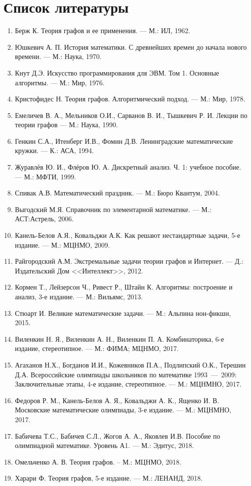 \sloppy
\chapter*{Список литературы}
\begin{enumerate}
\item Берж К. Теория графов и ее применения. --- М.: ИЛ, 1962.
\item Юшкевич А. П. История математики. С древнейших времен до начала нового времени. --- М.: Наука, 1970.
\item Кнут Д.Э. Искусство программирования для ЭВМ. Том 1. Основные алгоритмы. --- М.: Мир, 1976.
\item Кристофидес Н. Теория графов. Алгоритмический подход. --- М.: Мир, 1978.
\item Емеличев В. А., Мельников О.И., Сарванов В. И., Тышкевич Р. И. Лекции по теории графов --- М.: Наука, 1990.
\item Генкин С.А., Итенберг И.В., Фомин Д.В. Ленинградские математические кружки. --- К.: АСА, 1994.
\item Журавлёв Ю. И., Флёров Ю. А. Дискретный анализ. Ч. 1: учебное пособие. --- М.: МФТИ, 1999.
\item Спивак А.В. Математический праздник. --- М.: Бюро Квантум, 2004.
\item Выгодский М.Я. Справочник по элементарной математике. --- М.: АСТ:Астрель, 2006.
\item Канель-Белов А.Я., Ковальджи А.К. Как решают нестандартные задачи, 5-е издание. --- М.: МЦНМО, 2009.
\item Райгородский А.М. Экстремальные задачи теории графов и Интернет. --- Д.: Издательский Дом <<Интеллект>>, 2012.
\item Кормен Т., Лейзерсон Ч., Ривест Р., Штайн К. Алгоритмы: построение и анализ, 3-е издание. --- М.: Вильямс, 2013.
\item Стюарт И. Великие математические задачи. --- М.: Альпина нон-фикшн, 2015.
\item Виленкин Н. Я., Виленкин А. Н., Виленкин П. А. Комбинаторика, 6-е издание, стереотипное. --- М.: ФИМА; МЦНМО, 2017. 
\item Агаханов Н.Х., Богданов И.И., Кожевников П.А., Подлипский О.К., Терешин Д.А. Всероссийские олимпиады школьников по математике 1993~---~2009: Заключительные этапы, 4-е издание, стереотипное. --- М.: МЦНМНО, 2017. 
\item Федоров Р. М., Канель-Белов А. Я., Ковальджи А. К., Ященко И. В. Московские математические олимпиады, 3-е издание. --- М.: МЦНМНО, 2017. 
\item Бабичева Т.С., Бабичев С.Л., Жогов А. А., Яковлев И.В. Пособие по олимпиадной математике. Уровень А1. --- М.: Эдитус, 2018.
\item Омельченко А. В. Теория графов. -- М.: МЦНМО, 2018.
\item Харари Ф. Теория графов, 5-е издание. --- М.: ЛЕНАНД, 2018.
\end{enumerate}


